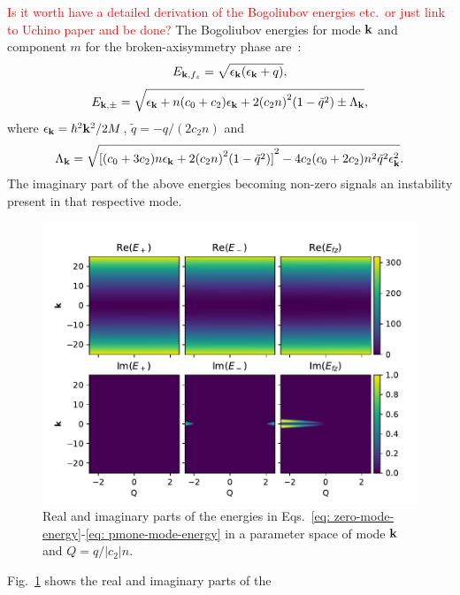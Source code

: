 \textcolor{red}{Is it worth have a detailed derivation of the
Bogoliubov energies etc.\ or just link to Uchino paper and be done?}
The Bogoliubov energies for mode \( \vb{k} \) and component \( m \) for the
broken-axisymmetry phase are~\cite{Uchino2010}:
\begin{equation}
    E_{\vb{k}, {f_z}} = \sqrt{\epsilon_{\vb{k}}(\epsilon_{\vb{k}} + q)},
    \label{eq: zero-mode-energy}
\end{equation}
\begin{equation}
    E_{{\vb{k}}, \pm} = \sqrt{\epsilon_{\vb{k}} + n(c_0 + c_2)\epsilon_{\vb{k}} 
    + 2{(c_2n)}^2(1 - \tilde{q}^2) \pm \Lambda_{\vb{k}}},
    \label{eq: pmone-mode-energy}
\end{equation}
where \( \epsilon_{\vb{k}} = \hbar^2\vb{k}^2 / 2M \), \( \tilde{q} = -q/(2c_2n) \)
and
\begin{equation}
    \Lambda_{\vb{k}} = \sqrt{{[(c_0+3c_2)n\epsilon_{\vb{k}} 
    + 2{(c_2n)}^2(1-\tilde{q}^2)]}^2 
    - 4c_2(c_0+2c_2)n^2\tilde{q}^2\epsilon_{\vb{k}}^2}.
\end{equation}
The imaginary part of the above energies becoming non-zero signals an
instability present in that respective mode.
\begin{figure}[tb]
    \centering
    \includegraphics[width=\textwidth]{gfx/ch-spin1/dens_spin_energies.pdf}
    \caption{Real and imaginary parts of the energies in
    Eqs.~\eqref{eq: zero-mode-energy}-\eqref{eq: pmone-mode-energy} in a
    parameter space of mode \( \vb{k} \) and
    \( Q=q/|c_2|n \).\label{fig: dens-spin-energies}}
\end{figure}
Fig.~\ref{fig: dens-spin-energies} shows the real and imaginary parts of the
